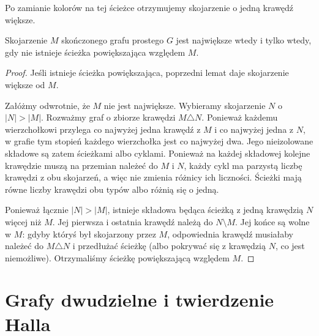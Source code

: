 \begin{center}

{\footnotesize Po zamianie kolorów na tej ścieżce
otrzymujemy skojarzenie o jedną krawędź większe.}
\end{center}

\begin{twierdzenie}[Berge]
\label{thm:tg-berge}
Skojarzenie $M$ skończonego grafu prostego $G$
jest największe wtedy i tylko wtedy, gdy
nie istnieje ścieżka powiększająca względem $M$.
\end{twierdzenie}

\begin{proof}
Jeśli istnieje ścieżka powiększająca, poprzedni lemat
daje skojarzenie większe od $M$.

Załóżmy odwrotnie, że $M$ nie jest największe.
Wybieramy skojarzenie $N$ o $|N|>|M|$.
Rozważmy graf o zbiorze krawędzi $M\triangle N$.
Ponieważ każdemu wierzchołkowi przylega co najwyżej
jedna krawędź z $M$ i co najwyżej jedna z $N$,
w grafie tym stopień każdego wierzchołka jest co
najwyżej dwa. Jego nieizolowane składowe są zatem
ścieżkami albo cyklami. Ponieważ na każdej składowej
kolejne krawędzie muszą na przemian należeć do $M$
i $N$, każdy cykl ma parzystą liczbę krawędzi
z obu skojarzeń, a więc nie zmienia różnicy ich
liczności. Ścieżki mają równe liczby krawędzi
obu typów albo różnią się o jedną.

Ponieważ łącznie $|N|>|M|$, istnieje składowa
będąca ścieżką z jedną krawędzią $N$ więcej
niż $M$. Jej pierwsza i ostatnia krawędź
należą do $N\setminus M$. Jej końce są wolne
w $M$: gdyby któryś był skojarzony przez $M$,
odpowiednia krawędź musiałaby należeć do $M\triangle N$
i przedłużać ścieżkę (albo pokrywać się z krawędzią
$N$, co jest niemożliwe). Otrzymaliśmy ścieżkę
powiększającą względem $M$.
\end{proof}

\section{Grafy dwudzielne i twierdzenie Halla}
\label{sec:tg-hall}

